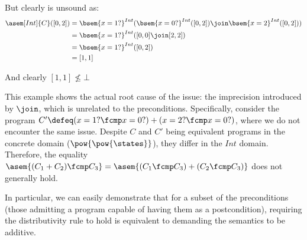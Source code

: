 \begin{example}
  But clearly is unsound as:
  \begin{align*}
    \asem[Int]{C}([0, 2]) &= \bsem{x = 1?}^{Int}(\bsem{x = 0?}^{Int}([0, 2]) 
      \join \bsem{x = 2}^{Int}([0, 2])) \\
                          &= \bsem{x = 1?}^{Int}([0, 0] \join [2, 2]) \\
                          &= \bsem{x = 1?}^{Int}([0, 2]) \\
                          &= [1, 1]
  \end{align*}

  And clearly $[1, 1] \not \leq \bot$
\end{example}

This example shows the actual root cause of the issue: the imprecision
introduced by $\join$, which is unrelated to the preconditions. Specifically,
consider the program $C' \defeq (x = 1? \fcmp x = 0?) + (x = 2? \fcmp x = 0?)$,
where we do not encounter the same issue. Despite $C$ and $C'$ being equivalent
programs in the concrete domain ($\pow{\pow{\states}}$), they differ in the
$Int$ domain. Therefore, the equality $\asem{(C_1 + C_2) \fcmp C_3} =
\asem{(C_1 \fcmp C_3) + (C_2 \fcmp C_3)}$ does not generally hold.

In particular, we can easily demonstrate that for a subset of the preconditions
(those admitting a program capable of having them as a postcondition), requiring 
the distributivity rule to hold is equivalent to demanding the semantics to be
additive.

